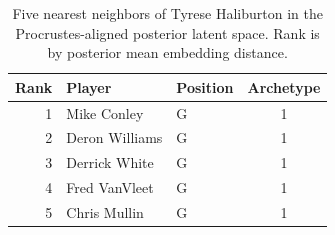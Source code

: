\begin{table}[htbp]
  \centering\small
  \begin{tabular}{rllc}
    \toprule
    Rank & Player & Position & Archetype \\
    \midrule
    1 & Mike Conley & G & 1 \\
    2 & Deron Williams & G & 1 \\
    3 & Derrick White & G & 1 \\
    4 & Fred VanVleet & G & 1 \\
    5 & Chris Mullin & G & 1 \\
    \bottomrule
  \end{tabular}
  \caption{Five nearest neighbors of Tyrese Haliburton in the Procrustes-aligned posterior latent space. Rank is by posterior mean embedding distance.}
  \label{tab:Tyrese_Haliburton_neighbors}
\end{table}

